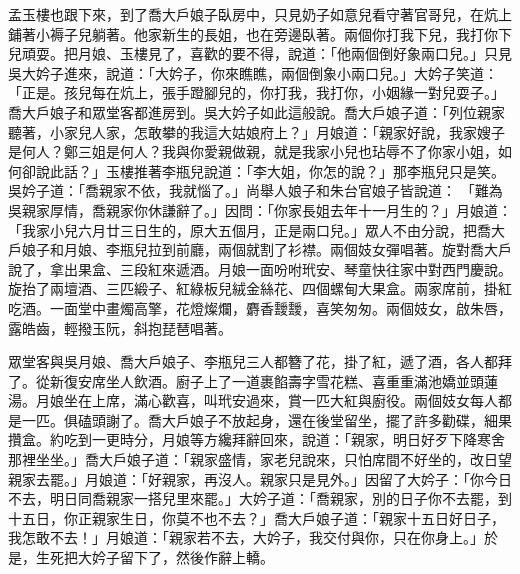 孟玉樓也跟下來，到了喬大戶娘子臥房中，只見奶子如意兒看守著官哥兒，在炕上鋪著小褥子兒躺著。他家新生的長姐，也在旁邊臥著。兩個你打我下兒，我打你下兒頑耍。把月娘、玉樓見了，喜歡的要不得，說道：「他兩個倒好象兩口兒。」只見吳大妗子進來，說道：「大妗子，你來瞧瞧，兩個倒象小兩口兒。」大妗子笑道：「正是。孩兒每在炕上，張手蹬腳兒的，你打我，我打你，小姻緣一對兒耍子。」喬大戶娘子和眾堂客都進房到。吳大妗子如此這般說。喬大戶娘子道：「列位親家聽著，小家兒人家，怎敢攀的我這大姑娘府上？」月娘道：「親家好說，我家嫂子是何人？鄭三姐是何人？我與你愛親做親，就是我家小兒也玷辱不了你家小姐，如何卻說此話？」玉樓推著李瓶兒說道：「李大姐，你怎的說？」那李瓶兒只是笑。吳妗子道：「喬親家不依，我就惱了。」尚舉人娘子和朱台官娘子皆說道： 「難為吳親家厚情，喬親家你休謙辭了。」因問：「你家長姐去年十一月生的？」月娘道：「我家小兒六月廿三日生的，原大五個月，正是兩口兒。」眾人不由分說，把喬大戶娘子和月娘、李瓶兒拉到前廳，兩個就割了衫襟。兩個妓女彈唱著。旋對喬大戶說了，拿出果盒、三段紅來遞酒。月娘一面吩咐玳安、琴童快往家中對西門慶說。旋抬了兩壇酒、三匹緞子、紅綠板兒絨金絲花、四個螺甸大果盒。兩家席前，掛紅吃酒。一面堂中畫燭高擎，花燈燦爛，麝香靉靉，喜笑匆匆。兩個妓女，啟朱唇，露皓齒，輕撥玉阮，斜抱琵琶唱著。

眾堂客與吳月娘、喬大戶娘子、李瓶兒三人都簪了花，掛了紅，遞了酒，各人都拜了。從新復安席坐人飲酒。廚子上了一道裹餡壽字雪花糕、喜重重滿池嬌並頭蓮湯。月娘坐在上席，滿心歡喜，叫玳安過來，賞一匹大紅與廚役。兩個妓女每人都是一匹。俱磕頭謝了。喬大戶娘子不放起身，還在後堂留坐，擺了許多勸碟，細果攢盒。約吃到一更時分，月娘等方纔拜辭回來，說道：「親家，明日好歹下降寒舍那裡坐坐。」喬大戶娘子道：「親家盛情，家老兒說來，只怕席間不好坐的，改日望親家去罷。」月娘道：「好親家，再沒人。親家只是見外。」因留了大妗子：「你今日不去，明日同喬親家一搭兒里來罷。」大妗子道：「喬親家，別的日子你不去罷，到十五日，你正親家生日，你莫不也不去？」喬大戶娘子道：「親家十五日好日子，我怎敢不去！」月娘道：「親家若不去，大妗子，我交付與你，只在你身上。」於是，生死把大妗子留下了，然後作辭上轎。

